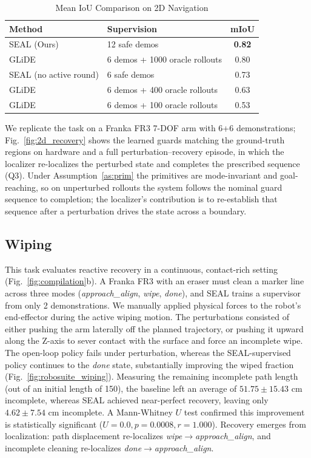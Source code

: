 \begin{table}[h]
    \centering
    \caption{Mean IoU Comparison on 2D Navigation}
    \label{tab:miou_results}
    \begin{tabular}{llc}
        \toprule
        \textbf{Method} & \textbf{Supervision} & \textbf{mIoU} \\
        \midrule
        SEAL (Ours) & 12 safe demos & \textbf{0.82} \\
        GLiDE & 6 demos + 1000 oracle rollouts & 0.80 \\
        SEAL (no active round) & 6 safe demos & 0.73 \\
        GLiDE & 6 demos + 400 oracle rollouts & 0.63 \\
        GLiDE & 6 demos + 100 oracle rollouts & 0.53 \\
        \bottomrule
    \end{tabular}
\end{table}

We replicate the task on a Franka FR3 7-DOF arm with 6+6 demonstrations; Fig.~\ref{fig:2d_recovery} shows the learned guards matching the ground-truth regions on hardware and a full perturbation--recovery episode, in which the localizer re-localizes the perturbed state and completes the prescribed sequence (Q3). Under Assumption~\ref{as:prim} the primitives are mode-invariant and goal-reaching, so on unperturbed rollouts the system follows the nominal guard sequence to completion; the localizer's contribution is to re-establish that sequence after a perturbation drives the state across a boundary.

\subsection{Wiping}
This task evaluates reactive recovery in a continuous, contact-rich setting (Fig.~\ref{fig:compilation}b). A Franka FR3 with an eraser must clean a marker line across three modes (\textit{approach\_align}, \textit{wipe}, \textit{done}), and SEAL trains a supervisor from only 2 demonstrations. We manually applied physical forces to the robot's end-effector during the active wiping motion. The perturbations consisted of either pushing the arm laterally off the planned trajectory, or pushing it upward along the Z-axis to sever contact with the surface and force an incomplete wipe. The open-loop policy fails under perturbation, whereas the SEAL-supervised policy continues to the \textit{done} state, substantially improving the wiped fraction (Fig.~\ref{fig:robosuite_wiping}). Measuring the remaining incomplete path length (out of an initial length of 150), the baseline left an average of $51.75 \pm 15.43$ cm incomplete, whereas SEAL achieved near-perfect recovery, leaving only $4.62 \pm 7.54$ cm incomplete. A Mann-Whitney $U$ test confirmed this improvement is statistically significant ($U=0.0, p=0.0008, r=1.000$). Recovery emerges from localization: path displacement re-localizes \textit{wipe}$\to$\textit{approach\_align}, and incomplete cleaning re-localizes \textit{done}$\to$\textit{approach\_align}.


